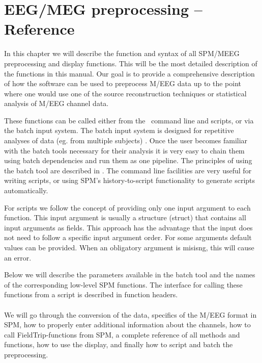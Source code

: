 \chapter{EEG/MEG preprocessing -- Reference \label{Chap:eeg:preprocessing}}

In this chapter we will describe the function and syntax of all SPM/MEEG preprocessing and display functions. This will be the most detailed description of the functions in this manual. Our goal is to provide a comprehensive description of how the software can be used to preprocess M/EEG data up to the point where one would use one of the source reconstruction techniques or statistical analysis of M/EEG channel data.

These functions can be called either from the \matlab\ command line and scripts, or via the batch input system. The batch input system is designed for repetitive analyses of data (eg. from multiple subjects) . Once the user becomes familiar with the batch tools necessary for their analysis it is very easy to chain them using batch dependencies and run them as one pipeline. The principles of  using the batch tool are described in . The command line facilities are very useful for writing scripts, or using SPM's history-to-script functionality to generate scripts automatically. 

For scripts  we follow the concept of providing only one input argument to each function. This input argument is usually a structure (struct) that contains all input arguments as fields. This approach has the advantage that the input does not need to follow a specific input argument order. For some arguments default values can be provided. When an obligatory argument is misisng, this will cause an error. 

Below we will describe the parameters available in the batch tool and the names of the corresponding low-level SPM functions. The interface for calling these functions from a script is described in function headers. 
\\
\\
We will go through the conversion of the data, specifics of the M/EEG format in SPM, how to properly enter additional information about the channels, how to call FieldTrip-functions from SPM, a complete reference of all methods and functions, how to use the display, and finally how to script and batch the preprocessing.

